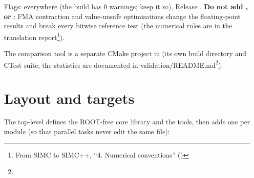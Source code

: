 Flags:  everywhere (the build has 0 warnings; keep it so), Release . \textbf{Do not
add ,  or }: FMA contraction and value-unsafe optimisations change the
floating-point results and break every bitwise reference test (the numerical rules are in the
translation report\footnote{From SIMC to SIMC++, ``4. Numerical conventions'' ()}).

The comparison tool  is a separate CMake project in  (its own build directory and CTest
suite; the statistics are documented in validation/\allowbreak{}README.md\footnote{}).

\section{\texorpdfstring{Layout and targets}{Layout and targets}}\label{developer_manual-02u5fbuild:22-layout-and-targets}
The top-level  defines the ROOT-free core library and the tools, then adds one  per
module (so that parallel tasks never edit the same file):

